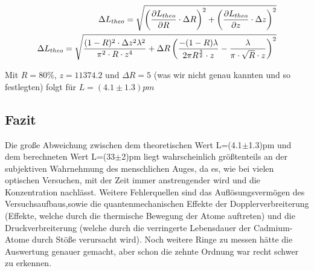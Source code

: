 \begin{equation}\notag
\begin{split}
\Delta L_{theo}=\sqrt{\left(\frac{\partial L_{theo}}{\partial R}\cdot \Delta R\right)^2+\left(\frac{\partial L_{theo}}{\partial z}\cdot \Delta z\right)^2}\\
\Delta L_{theo}=\sqrt{\frac{(1-R)^2\cdot\Delta z^2\lambda^2}{\pi^2\cdot R\cdot z^4}+\Delta R\left(\frac{-(1-R)\lambda}{2\pi R^{\frac{3}{2}}\cdot z}-\frac{\lambda}{\pi \cdot \sqrt{R}\cdot z}\right)^2}
\end{split}
\end{equation}

Mit $R=80\%$, $z=11374.2$ und $\Delta R=5$ (was wir nicht genau kannten und so festlegten) folgt für $L=(4.1\pm 1.3)pm$

\subsection{Fazit}
Die große Abweichung zwischen dem theoretischen Wert L=(4.1$\pm$1.3)pm und dem berechneten Wert L=(33$\pm$2)pm liegt wahrscheinlich größtenteils an der subjektiven Wahrnehmung des menschlichen Auges, da es, wie bei vielen optischen Versuchen, mit der Zeit immer anstrengender wird und die Konzentration nachlässt. Weitere Fehlerquellen sind das Auflösungsvermögen des Versuchsaufbaus,sowie die quantenmechanischen Effekte der Dopplerverbreiterung (Effekte, welche durch die thermische Bewegung der Atome auftreten) und die Druckverbreiterung (welche durch die verringerte Lebensdauer der Cadmium-Atome durch Stöße verursacht wird).
Noch weitere Ringe zu messen hätte die Auswertung genauer gemacht, aber schon die zehnte Ordnung war recht schwer zu erkennen.